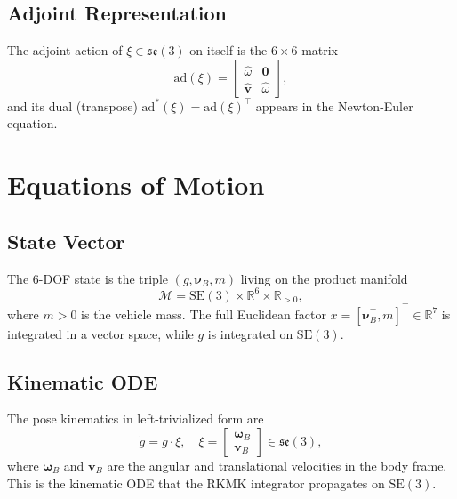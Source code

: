 \documentclass[a4paper,10pt]{article}
\newcommand{\SE}{\mathrm{SE}(3)}
\newcommand{\se}{\mathfrak{se}(3)}
\newcommand{\ad}{\mathrm{ad}}
\newcommand{\R}{\mathbb{R}}
\newcommand{\skw}[1]{\widehat{#1}}
\newcommand{\nuB}{\boldsymbol{\nu}_B}
\newcommand{\omB}{\boldsymbol{\omega}_B}
\newcommand{\vB}{\mathbf{v}_B}
\theoremstyle{definition}
\begin{document}
\subsection{Adjoint Representation}

The adjoint action of $\xi \in \se$ on itself is the $6\times6$ matrix
\begin{equation}
  \ad(\xi) =
  \begin{bmatrix}
    \skw{\omega} & \mathbf{0} \\
    \skw{\mathbf{v}} & \skw{\omega}
  \end{bmatrix},
  \label{eq:adjoint}
\end{equation}
and its dual (transpose) $\ad^*(\xi) = \ad(\xi)^\top$ appears in the
Newton-Euler equation.

\section{Equations of Motion}
\label{sec:eom}

\subsection{State Vector}

The 6-DOF state is the triple $(g, \nuB, m)$ living on the product manifold
\begin{equation}
  \mathcal{M} = \SE \times \R^6 \times \R_{>0},
  \label{eq:state_manifold}
\end{equation}
where $m > 0$ is the vehicle mass.  The full Euclidean factor
$x = [\nuB^\top, m]^\top \in \R^7$ is integrated in a vector space, while $g$
is integrated on $\SE$.

\subsection{Kinematic ODE}

The pose kinematics in left-trivialized form are
\begin{equation}
  \dot{g} = g \cdot \xi,
  \quad
  \xi = \begin{bmatrix} \omB \\ \vB \end{bmatrix} \in \se,
  \label{eq:kinematics}
\end{equation}
where $\omB$ and $\vB$ are the angular and translational velocities in the
body frame.  This is the kinematic ODE that the RKMK integrator propagates on
$\SE$.
\end{document}
